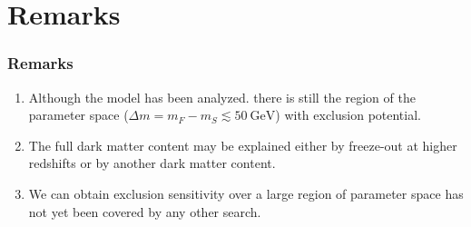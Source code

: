 \documentclass{beamer}
\begin{document}
\section{Remarks}
\begin{frame}
\frametitle{Remarks}

\begin{exampleblock}{}

\begin{enumerate}

\item Although the model has been analyzed. there is still the region of the parameter space ($\Delta m=m_{F}-m_S\lesssim 50\ \text{GeV}$) with exclusion potential.
\item The full dark matter content may be explained either by freeze-out at higher redshifts or by another dark matter content.
\item  We can obtain exclusion sensitivity over a large region of parameter space has not yet been covered by any other search.
\end{enumerate}

\end{exampleblock}

\end{frame}




\ThankYouFrame


\end{document}
